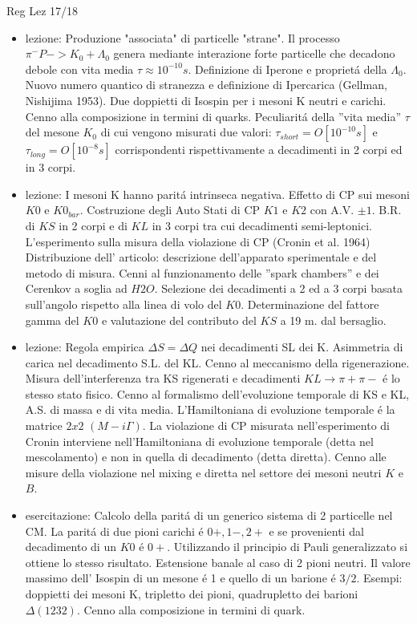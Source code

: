 \begin{frame}[allowframebreaks]{Reg Lez 17/18}
\begin{itemize}
\item lezione: Produzione "associata" di particelle "strane". Il processo $\pi^- P ->K_0 + \Lambda_0$ genera mediante interazione forte particelle che decadono debole con vita media $\tau\approx 10^{-10} s$. Definizione di Iperone e propriet\'a della $\Lambda_0$. Nuovo numero quantico di stranezza e definizione di Ipercarica (Gellman, Nishijima 1953). Due doppietti di Isospin per i mesoni K neutri e carichi. Cenno alla composizione in termini di quarks. Peculiarit\'a della ''vita media'' $\tau$ del mesone $K_0$ di cui vengono misurati due valori: $\tau_{short}=O[10^{-10}s]$ e $\tau_{long}=O[10^{-8}s]$ corrispondenti rispettivamente a decadimenti in 2 corpi ed in 3 corpi. 
\item lezione: I mesoni K hanno parit\'a intrinseca negativa. Effetto di CP sui mesoni $K0$ e $K0_{bar}$. Costruzione degli Auto Stati di CP $K1$ e $K2$ con A.V. $\pm1$. B.R. di $KS$ in 2 corpi e di $KL$ in 3 corpi tra cui decadimenti semi-leptonici. L'esperimento sulla misura della violazione di CP (Cronin et al. 1964) Distribuzione dell' articolo: descrizione dell'apparato sperimentale e del metodo di misura. Cenni al funzionamento delle ''spark chambers'' e dei Cerenkov a soglia ad $H2O$. Selezione dei decadimenti a 2 ed a 3 corpi basata sull'angolo rispetto alla linea di volo del $K0$. Determinazione del fattore gamma del $K0$ e valutazione del contributo del $KS$ a 19 m. dal bersaglio.
\item lezione: Regola empirica $\Delta S=\Delta Q$ nei decadimenti SL dei K. Asimmetria di carica nel decadimento S.L. del KL. Cenno al meccanismo della rigenerazione. Misura dell'interferenza tra KS rigenerati e decadimenti $KL\to\pi+\pi-$ \'e lo stesso stato fisico. Cenno al formalismo dell'evoluzione temporale di KS e KL, A.S. di massa e di vita media. L'Hamiltoniana di evoluzione temporale \'e la matrice $2x2$ $(M-i\Gamma)$. La violazione di CP misurata nell'esperimento di Cronin interviene nell'Hamiltoniana di evoluzione temporale (detta nel mescolamento) e non in quella di decadimento (detta diretta). Cenno alle misure della violazione nel mixing e diretta nel settore dei mesoni neutri $K$ e $B$. 
\item esercitazione: Calcolo della parit\'a di un generico sistema di 2 particelle nel CM. La parit\'a di due pioni carichi \'e $0+,1-,2+$ e se provenienti dal decadimento di un $K0$ \'e $0+$. Utilizzando il principio di Pauli generalizzato si ottiene lo stesso risultato. Estensione banale al caso di 2 pioni neutri. Il valore massimo dell' Isospin di un mesone \'e 1 e quello di un barione \'e $3/2$. Esempi: doppietti dei mesoni K, tripletto dei pioni, quadrupletto dei barioni $\Delta(1232)$. Cenno alla composizione in termini di quark.

\end{itemize}
\end{frame}
